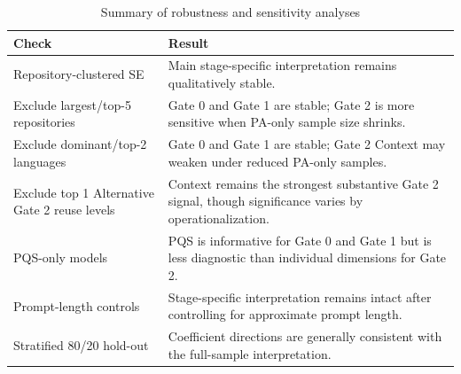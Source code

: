 \begin{table}
\caption{Summary of robustness and sensitivity analyses}
\label{tab:robustness-summary}
\begin{tabular}{ll}
\toprule
Check & Result \\
\midrule
Repository-clustered SE & Main stage-specific interpretation remains qualitatively stable. \\
Exclude largest/top-5 repositories & Gate 0 and Gate 1 are stable; Gate 2 is more sensitive when PA-only sample size shrinks. \\
Exclude dominant/top-2 languages & Gate 0 and Gate 1 are stable; Gate 2 Context may weaken under reduced PA-only samples. \\
Exclude top 1%
Alternative Gate 2 reuse levels & Context remains the strongest substantive Gate 2 signal, though significance varies by operationalization. \\
PQS-only models & PQS is informative for Gate 0 and Gate 1 but is less diagnostic than individual dimensions for Gate 2. \\
Prompt-length controls & Stage-specific interpretation remains intact after controlling for approximate prompt length. \\
Stratified 80/20 hold-out & Coefficient directions are generally consistent with the full-sample interpretation. \\
\bottomrule
\end{tabular}
\end{table}
